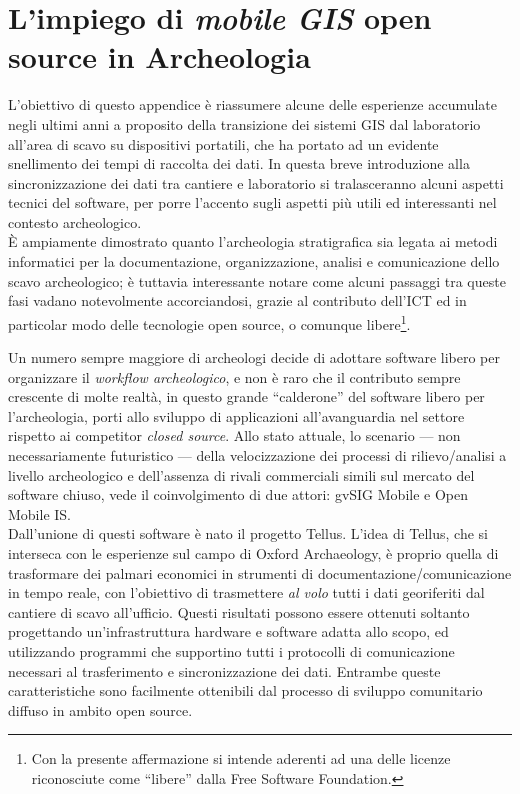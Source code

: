 \chapter{L'impiego di \emph{mobile GIS} open source in Archeologia}

L'obiettivo di questo appendice è riassumere alcune delle esperienze accumulate negli ultimi anni a proposito della transizione dei sistemi GIS dal laboratorio all'area di scavo su dispositivi portatili, che ha portato ad un evidente snellimento dei tempi di raccolta dei dati.  In questa breve introduzione alla sincronizzazione dei dati tra cantiere e laboratorio si tralasceranno alcuni aspetti tecnici del software, per porre l'accento sugli aspetti più utili ed interessanti nel contesto archeologico.\\

È ampiamente dimostrato quanto l'archeologia stratigrafica sia legata ai metodi informatici per la documentazione, organizzazione, analisi e comunicazione dello scavo archeologico; è tuttavia interessante notare come alcuni passaggi tra queste fasi vadano notevolmente accorciandosi, grazie al contributo dell'ICT ed in particolar modo delle tecnologie open source, o comunque libere\footnote{Con la presente affermazione si intende aderenti ad una delle licenze riconosciute come ``libere'' dalla Free Software Foundation.}.

Un numero sempre maggiore di archeologi decide di adottare software libero per organizzare il \emph{workflow archeologico}, e non è raro che il contributo sempre crescente di molte realtà, in questo grande ``calderone'' del software libero per l'archeologia, porti allo sviluppo di applicazioni all'avanguardia nel settore rispetto ai competitor \emph{closed source}. Allo stato attuale, lo scenario --- non necessariamente futuristico --- della velocizzazione dei processi di rilievo/analisi a livello archeologico e dell'assenza di rivali commerciali simili sul mercato del software chiuso, vede il coinvolgimento di due attori: gvSIG Mobile e Open Mobile IS.\\

Dall'unione di questi software è nato il progetto Tellus. L'idea di Tellus, che si interseca con le esperienze sul campo di Oxford Archaeology, è proprio quella di trasformare dei palmari economici in strumenti di documentazione/comunicazione in tempo reale, con l'obiettivo di trasmettere \emph{al volo} tutti i dati georiferiti dal cantiere di scavo all'ufficio. Questi risultati possono essere ottenuti soltanto progettando un'infrastruttura hardware e software adatta allo scopo, ed utilizzando programmi che supportino tutti i protocolli di comunicazione necessari al trasferimento e sincronizzazione dei dati. Entrambe queste caratteristiche sono facilmente ottenibili dal processo di sviluppo comunitario diffuso in ambito open source.

